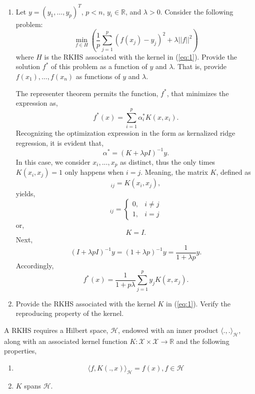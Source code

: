 \documentclass[12pt]{article}
\begin{document}
\begin{enumerate}
\newpage
\item 
Let $y=(y_1,\ldots,y_p)^T$, $p<n$, $y_i \in \mathbb{R}$, and $\lambda >0$. 
Consider the following problem: 
\begin{equation}
\min_{f \in H}\left( \frac{1}{p}\sum_{j=1}^p (f(x_j)-y_j)^2 + \lambda||f||^2\right)
\end{equation}
where $H$ is the RKHS associated with the kernel in (\ref{eq:1}). Provide the solution $f^*$ of this problem as a function of $y$ and $\lambda$.  
That is, provide $f(x_1),\ldots,f(x_n)$ as functions of $y$ and $\lambda$.

The representer theorem permits the function, $f^*$, that minimizes the expression as,
\begin{equation}
f^*(x) = \sum_{i=1}^{p} \alpha^*_i K(x, x_i).
\end{equation}
Recognizing the optimization expression in the form as kernalized ridge regression, it is evident that,
\begin{equation}
\alpha^* = \left( K + \lambda p I \right)^{-1} y.
\end{equation}
In this case, we consider $x_i, ..., x_p$ as distinct, thus the only times $K(x_i, x_j) = 1$ only happens when $i=j$. Meaning, the matrix $K$, defined as
\begin{equation}
[K]_{ij} = K(x_i, x_j),
\end{equation}
yields,
\begin{equation}
[K]_{ij}=\left\{\begin{array}{ll}{0,} & {i \ne j} \\ {1,} & {i =  j}\end{array}\right.
\end{equation}
or, 
\begin{equation}
K = I.
\end{equation}
Next,
\begin{equation}
(I + \lambda p I)^{-1}y = (1 + \lambda p)^{-1}y = \frac{1}{1+\lambda p}y.
\end{equation}
Accordingly,
\begin{equation}
f^*(x)= \frac{1}{1+p \lambda} \sum_{j=1}^{p} y_j K(x, x_j).
\end{equation}
\newpage

\item Provide the RKHS associated with the kernel $K$ in (\ref{eq:1}). Verify the reproducing property of the kernel.  
\end{enumerate}
A RKHS requires a Hilbert space, $\mathcal H$, endowed with an inner product $\langle . , . \rangle_{\mathcal H}$, along with an associated kernel function $K: \mathcal X \times \mathcal X \rightarrow \mathbb R$ and the following properties,
\begin{enumerate}
\item \[ \langle f, K(., x) \rangle_{\mathcal H}= f(x), f \in \mathcal H \]
\item $K$ spans $\mathcal H$.
\end{enumerate}
\end{document}
